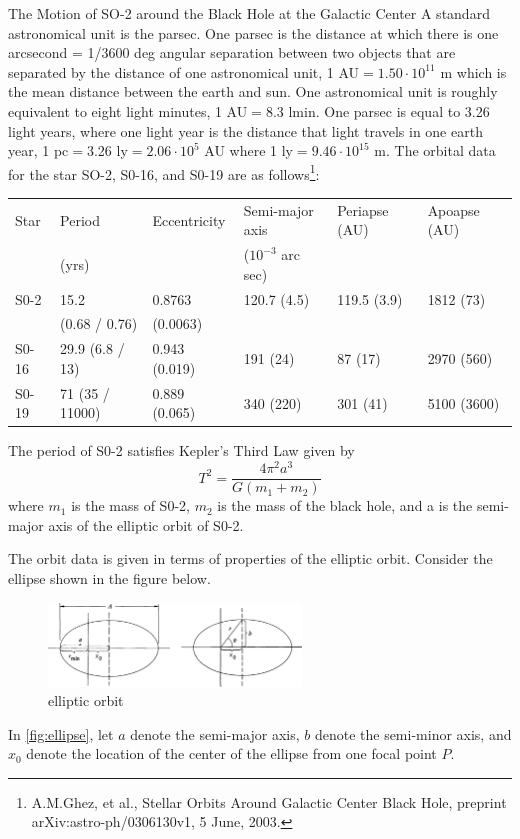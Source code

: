 \documentclass{esg8012pset}
\begin{document}
\begin{problem}{The Motion of SO-2 around the Black Hole at the Galactic Center}
    A standard astronomical unit is the parsec. One parsec is the distance at which there is one arcsecond = 1/3600 deg angular separation between two objects that are separated by the distance of one astronomical unit, 1 AU${} = 1.50 \cdot 10^{11}$ m which is the mean distance between the earth and sun. One astronomical unit is roughly equivalent to eight light minutes,  1 AU${} = 8.3$ lmin.  One parsec is equal to 3.26 light years, where one light year is the distance that light travels in one earth year, 1 pc${} = {}$3.26 ly${} = 2.06 \cdot 10^5$ AU where 1 ly${} = 9.46 \cdot 10^{15}$ m. The orbital data for the star SO-2, S0-16, and S0-19 are as follows\footnote{A.M.Ghez, et al., Stellar Orbits Around Galactic Center Black Hole, preprint arXiv:astro-ph/0306130v1, 5 June, 2003.}:
    \begin{center}
      \begin{tabular}{|l|l|l|l|l|l|}
        \hline Star  & Period          & Eccentricity  & Semi-major axis     & Periapse (AU) & Apoapse (AU) \\
                     & (yrs)           &               & ($10^{-3}$ arc sec) &               &              \\
        \hline S0-2  & 15.2            & 0.8763        & 120.7 (4.5)         & 119.5 (3.9)   & 1812 (73)    \\
                     & (0.68 / 0.76)   & (0.0063)      &                     &               &              \\
        \hline S0-16 & 29.9 (6.8 / 13) & 0.943 (0.019) & 191 (24)            & 87 (17)       & 2970 (560)   \\
        \hline S0-19 & 71 (35 / 11000) & 0.889 (0.065) & 340 (220)           & 301 (41)      & 5100 (3600)  \\ \hline
      \end{tabular}
    \end{center}
    The period of S0-2 satisfies Kepler's Third Law given by
    $$T^2 = \frac{4\pi^2 a^3}{G(m_1 + m_2)}$$
    where $m_1$ is the mass of S0-2, $m_2$ is the mass of the black hole, and a is the semi-major axis of the elliptic orbit of S0-2.

    The orbit data is given in terms of properties of the elliptic orbit. Consider the ellipse shown in the figure below.
    \begin{figure}[!h] 
      \begin{center}\includegraphics[width=0.6\textwidth]{ps10_5}\end{center}
      \caption{elliptic orbit} \label{fig:ellipse}
    \end{figure}
    In \autoref{fig:ellipse}, let $a$ denote the semi-major axis, $b$ denote the semi-minor axis, and $x_0$ denote the location of the center of the ellipse from one focal point $P$.


\end{problem}
\end{document}
